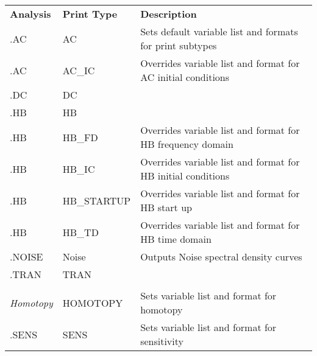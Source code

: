 

{
\renewcommand{\arraystretch}{1.2}
\begin{tabular}{>{\ttfamily\small}m{1in}<{\normalfont}>{\ttfamily\small}m{1in}<{\normalfont}m{2.25in}@{}}
  \rowcolor{XyceDarkBlue}
  \color{white}\normalfont\bf Analysis &
  \color{white}\bf Print Type &
  \color{white}\bf Description \\
.AC & AC & Sets default variable list and formats for print subtypes \\ \hline
.AC & AC\_IC & Overrides variable list and format for AC initial conditions \\ \hline
.DC & DC &  \\ \hline
.HB & HB & \\ \hline
.HB & HB\_FD & Overrides variable list and format for HB frequency domain \\ \hline
.HB & HB\_IC & Overrides variable list and format for HB initial conditions \\ \hline
.HB & HB\_STARTUP & Overrides variable list and format for HB start up \\ \hline
.HB & HB\_TD & Overrides variable list and format for HB time domain \\ \hline
.NOISE & Noise & Outputs Noise spectral density curves\\ \hline
.TRAN & TRAN &  \\ \hline
\multicolumn{3}{c}{\smallskip\color{XyceDarkBlue}\em\bfseries Specialized Output Commands} \\
\emph{Homotopy} & HOMOTOPY & Sets variable list and format for homotopy \\ \hline
.SENS & SENS & Sets variable list and format for sensitivity \\ \hline
\end{tabular}
}
